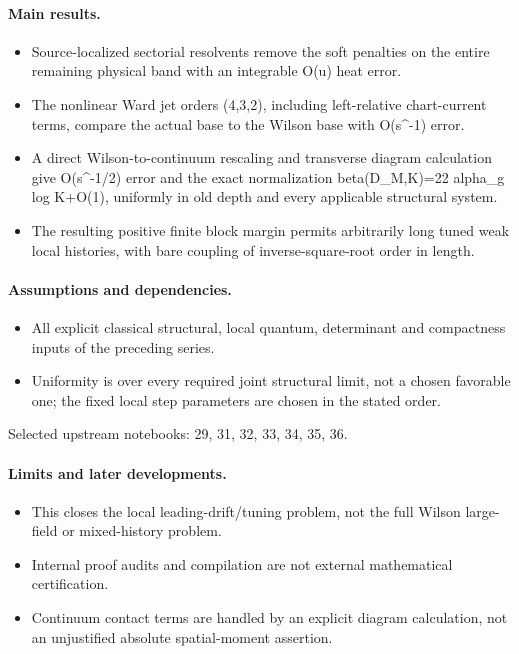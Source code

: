 \paragraph{Main results.}
\begin{itemize}
\item Source-localized sectorial resolvents remove the soft penalties on the entire remaining physical band with an integrable O(u) heat error.
\item The nonlinear Ward jet orders (4,3,2), including left-relative chart-current terms, compare the actual base to the Wilson base with O(s\textasciicircum{}-1) error.
\item A direct Wilson-to-continuum rescaling and transverse diagram calculation give O(s\textasciicircum{}-1/2) error and the exact normalization beta(D\_M,K)=22 alpha\_g log K+O(1), uniformly in old depth and every applicable structural system.
\item The resulting positive finite block margin permits arbitrarily long tuned weak local histories, with bare coupling of inverse-square-root order in length.
\end{itemize}

\paragraph{Assumptions and dependencies.}
\begin{itemize}
\item All explicit classical structural, local quantum, determinant and compactness inputs of the preceding series.
\item Uniformity is over every required joint structural limit, not a chosen favorable one; the fixed local step parameters are chosen in the stated order.
\end{itemize}

Selected upstream notebooks: 29, 31, 32, 33, 34, 35, 36.\par

\paragraph{Limits and later developments.}
\begin{itemize}
\item This closes the local leading-drift/tuning problem, not the full Wilson large-field or mixed-history problem.
\item Internal proof audits and compilation are not external mathematical certification.
\item Continuum contact terms are handled by an explicit diagram calculation, not an unjustified absolute spatial-moment assertion.
\end{itemize}


